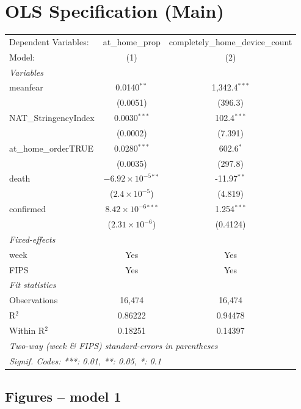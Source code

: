 \documentclass{article}
\author{George Tyler}
\date{\today}
\begin{document}
\section{OLS Specification (Main)}
\begin{tabular}{lcc}
    \tabularnewline\midrule\midrule
    Dependent Variables:&at\_home\_prop&completely\_home\_device\_count\\
    Model:&(1) & (2)\\
    \midrule \emph{Variables}&   &  \\
    meanfear&0.0140$^{**}$ & 1,342.4$^{***}$\\
      &(0.0051) & (396.3)\\
    NAT\_StringencyIndex&0.0030$^{***}$ & 102.4$^{***}$\\
      &(0.0002) & (7.391)\\
    at\_home\_orderTRUE&0.0280$^{***}$ & 602.6$^{*}$\\
      &(0.0035) & (297.8)\\
    death&$-6.92\times 10^{-5}$$^{**}$ & -11.97$^{**}$\\
      &($2.4\times 10^{-5}$) & (4.819)\\
    confirmed&$8.42\times 10^{-6}$$^{***}$ & 1.254$^{***}$\\
      &($2.31\times 10^{-6}$) & (0.4124)\\
    \midrule \emph{Fixed-effects}&   &  \\
    week & Yes & Yes\\
    FIPS & Yes & Yes\\
    \midrule \emph{Fit statistics}&  & \\
    Observations & 16,474&16,474\\
    R$^2$ & 0.86222&0.94478\\
    Within R$^2$ & 0.18251&0.14397\\
    \midrule\midrule\multicolumn{3}{l}{\emph{Two-way (week \& FIPS) standard-errors in parentheses}}\\
    \multicolumn{3}{l}{\emph{Signif. Codes: ***: 0.01, **: 0.05, *: 0.1}}\\
\end{tabular}
\subsection{Figures -- model 1}
\end{document}
